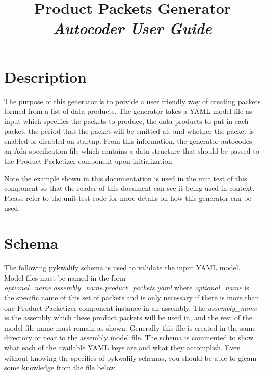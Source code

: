 



\title{\textbf{Product Packets Generator} \\
\large\textit{Autocoder User Guide}}
\date{}
\maketitle

\section{Description}

The purpose of this generator is to provide a user friendly way of creating packets formed from a list of data products. The generator takes a YAML model file as input which specifies the packets to produce, the data products to put in each packet, the period that the packet will be emitted at, and whether the packet is enabled or disabled on startup. From this information, the generator autocodes an Ada specification file which contains a data structure that should be passed to the Product Packetizer component upon initialization.

Note the example shown in this documentation is used in the unit test of this component so that the reader of this document can see it being used in context. Please refer to the unit test code for more details on how this generator can be used.

\section{Schema}

The following pykwalify schema is used to validate the input YAML model. Model files must be named in the form \textit{optional\_name.assembly\_name.product\_packets.yaml} where \textit{optional\_name} is the specific name of this set of packets and is only necessary if there is more than one Product Packetizer component instance in an assembly. The \textit{assembly\_name} is the assembly which these product packets will be used in, and the rest of the model file name must remain as shown. Generally this file is created in the same directory or near to the assembly model file. The schema is commented to show what each of the available YAML keys are and what they accomplish. Even without knowing the specifics of pykwalify schemas, you should be able to gleam some knowledge from the file below.

